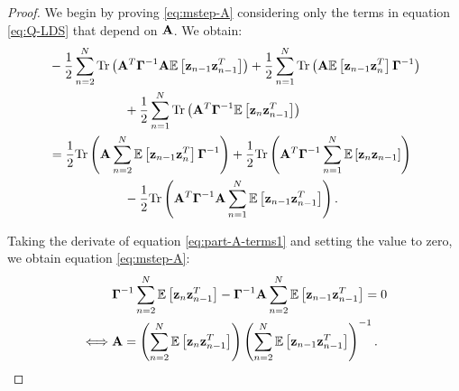 \documentclass[11pt]{article}
\numberwithin{equation}{section}
\newcommand{\expectation}[1]{\mathbb{E}\left[#1\right]}
\newcommand{\z}{{\bf z}}
\begin{document}
\begin{proof}
	We begin by proving \eqref{eq:mstep-A} considering only the terms in equation \eqref{eq:Q-LDS} that depend on $\bf A$. We obtain:
	\begin{align}
		& -\frac{1}{2}\sum_{n=2}^N \text{Tr}\left({\bf A}^T\boldsymbol{\Gamma}^{-1}{\bf A}\expectation{\z_{n-1}\z_{n-1}^T}\right) + \frac{1}{2}\sum_{n=1}^N\text{Tr}\left({\bf A}\expectation{\z_{n-1}\z_n^T}\boldsymbol{\Gamma}^{-1}\right) \nonumber\\
		&\hspace{2.1cm} + \frac{1}{2}\sum_{n=1}^N\text{Tr}\left({\bf A}^T \boldsymbol\Gamma^{-1} \expectation{\z_n\z_{n-1}^T}\right)\\
		&= \frac{1}{2}\text{Tr}\left({\bf A} \sum_{n=2}^N \expectation{\z_{n-1}\z_n^T} \boldsymbol\Gamma^{-1}\right) + \frac{1}{2}\text{Tr}\left({\bf A}^T\boldsymbol\Gamma^{-1} \sum_{n=1}^N\expectation{\z_n\z_{n-1}}\right) \nonumber\\
		&\hspace{2.1cm} - \frac{1}{2}\text{Tr}\left({\bf A}^T \boldsymbol\Gamma^{-1} {\bf A}\sum_{n=1}^N \expectation{\z_{n-1}\z_{n-1}^T}\right)\label{eq:part-A-terms1}.
	\end{align}
	
	Taking the derivate of equation \eqref{eq:part-A-terms1} and setting the value to zero, we obtain equation \eqref{eq:mstep-A}:
	\begin{align}
		&\boldsymbol{\Gamma}^{-1} \sum_{n=2}^N \expectation{\z_n\z_{n-1}^T} - \boldsymbol{\Gamma}^{-1} {\bf A} \sum_{n=2}^N\expectation{\z_{n-1}\z_{n-1}^T} = 0\\
		\iff& {\bf A} = \left(\sum_{n=2}^N \expectation{\z_n \z_{n-1}^T}\right)\left(\sum_{n=2}^N \expectation{\z_{n-1}\z_{n-1}^T}\right)^{-1}.
	\end{align}
\end{proof}
\end{document}
